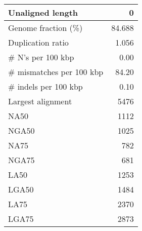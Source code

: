 \documentclass[12pt,a4paper]{article}
\begin{document}
\begin{table}[ht]
\begin{center}
\begin{tabular}{|l*{1}{|r}|}
Unaligned length & 0 \\ \hline
Genome fraction (\%) & 84.688 \\ \hline
Duplication ratio & 1.056 \\ \hline
\# N's per 100 kbp & 0.00 \\ \hline
\# mismatches per 100 kbp & 84.20 \\ \hline
\# indels per 100 kbp & 0.10 \\ \hline
Largest alignment & 5476 \\ \hline
NA50 & 1112 \\ \hline
NGA50 & 1025 \\ \hline
NA75 & 782 \\ \hline
NGA75 & 681 \\ \hline
LA50 & 1253 \\ \hline
LGA50 & 1484 \\ \hline
LA75 & 2370 \\ \hline
LGA75 & 2873 \\ \hline
\end{tabular}
\end{center}
\end{table}
\end{document}
